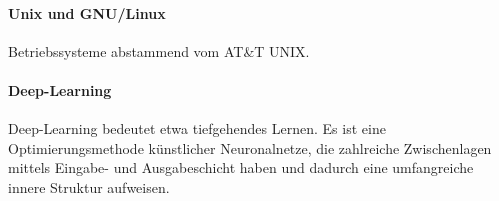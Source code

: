\paragraph{Unix und GNU/Linux} Betriebssysteme abstammend vom AT\&T UNIX.
\paragraph{Deep-Learning} Deep-Learning bedeutet etwa tiefgehendes Lernen. Es ist eine Optimierungsmethode künstlicher Neuronalnetze, die zahlreiche Zwischenlagen mittels Eingabe- und Ausgabeschicht haben und dadurch eine umfangreiche innere Struktur aufweisen.
